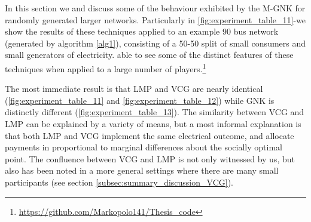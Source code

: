 In this section we \DIFdelbegin {}\DIFdelend \DIFaddbegin {}\DIFaddend and discuss some of the behaviour exhibited by the M-GNK \DIFdelbegin {}\DIFdelend \DIFaddbegin {}\DIFaddend for randomly generated larger networks.
Particularly in \DIFdelbegin {}\DIFdelend \DIFaddbegin {}\DIFaddend \ref{fig:experiment_table_11}-\DIFdelbegin \DIFdel{\ref{fig:experiment_table_14} }\DIFdelend \DIFaddbegin \DIFadd{\ref{fig:experiment_table_15} }\DIFaddend we show the results of these techniques applied to an example 90 bus network (generated by algorithm \ref{alg1}), consisting of a 50-50 split of small consumers and small generators of electricity.
\DIFdelbegin {}\DIFdelend \DIFaddbegin {}\DIFaddend able to see some of the distinct features of these techniques when applied to a large number of players.\DIFaddbegin \footnote{\href{https://github.com/Markopolo141/Thesis\_code}{https://github.com/Markopolo141/Thesis\_code}}
\DIFaddend 

The most immediate result is that LMP and VCG are nearly identical (\DIFdelbegin {}\DIFdelend \DIFaddbegin {}\DIFaddend \ref{fig:experiment_table_11} and \ref{fig:experiment_table_12}) while \DIFaddbegin {}\DIFaddend GNK is distinctly different (\ref{fig:experiment_table_13}).
The similarity between VCG and LMP can be explained by a variety of means, but a most informal explanation is that both LMP and VCG implement the same electrical outcome, and allocate payments in proportional to marginal differences about the socially optimal point.
The confluence between VCG and LMP is not only witnessed by us, but also has been noted in a more general settings where there are many small participants \citep{NATH2019673, 8430852} (see section \ref{subsec:summary_discussion_VCG}).%
\DIFaddbegin {}\DIFaddend 

